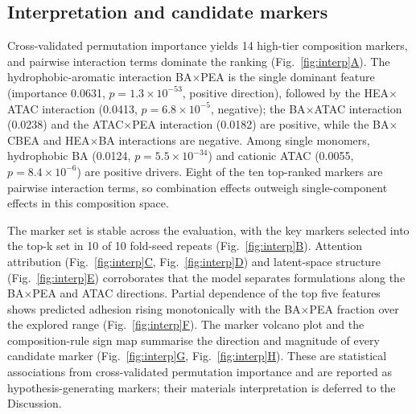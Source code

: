 \documentclass[utf8]{FrontiersinHarvard}
\newcommand{\Fref}[2]{Fig.~\hyperref[#1]{\ref{#1}#2}}
\begin{document}
\subsection{Interpretation and candidate markers}

Cross-validated permutation importance yields 14 high-tier composition markers, and pairwise interaction terms dominate the ranking (\Fref{fig:interp}{A}). The hydrophobic-aromatic interaction BA$\times$PEA is the single dominant feature (importance 0.0631, $p = 1.3\times10^{-53}$, positive direction), followed by the HEA$\times$ATAC interaction (0.0413, $p = 6.8\times10^{-5}$, negative); the BA$\times$ATAC interaction (0.0238) and the ATAC$\times$PEA interaction (0.0182) are positive, while the BA$\times$CBEA and HEA$\times$BA interactions are negative. Among single monomers, hydrophobic BA (0.0124, $p = 5.5\times10^{-34}$) and cationic ATAC (0.0055, $p = 8.4\times10^{-6}$) are positive drivers. Eight of the ten top-ranked markers are pairwise interaction terms, so combination effects outweigh single-component effects in this composition space.

The marker set is stable across the evaluation, with the key markers selected into the top-k set in 10 of 10 fold-seed repeats (\Fref{fig:interp}{B}). Attention attribution (\Fref{fig:interp}{C}, \Fref{fig:interp}{D}) and latent-space structure (\Fref{fig:interp}{E}) corroborates that the model separates formulations along the BA$\times$PEA and ATAC directions. Partial dependence of the top five features shows predicted adhesion rising monotonically with the BA$\times$PEA fraction over the explored range (\Fref{fig:interp}{F}). The marker volcano plot and the composition-rule sign map summarise the direction and magnitude of every candidate marker (\Fref{fig:interp}{G}, \Fref{fig:interp}{H}). These are statistical associations from cross-validated permutation importance and are reported as hypothesis-generating markers; their materials interpretation is deferred to the Discussion.
\end{document}
